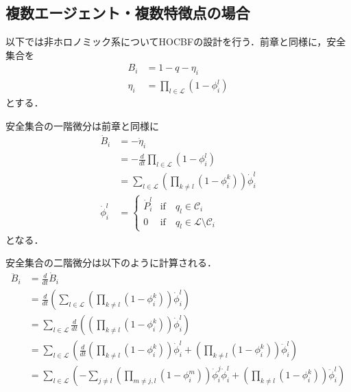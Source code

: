 \subsection{複数エージェント・複数特徴点の場合}

以下では非ホロノミック系についてHOCBFの設計を行う．前章と同様に，安全集合を
\begin{equation}
\begin{aligned}
B_{i} &= 1 - q - \eta_{i} \\
\eta_{i} &= \prod_{l \in \mathcal{L}} (1 - \phi_{i}^l)
\label{eq:safe_set_multi_hocbf}
\end{aligned}
\end{equation}
とする．

安全集合の一階微分は前章と同様に
\begin{equation}
\begin{aligned}
\dot{B}_{i} &= -\dot{\eta}_{i} \\
&= -\frac{d}{dt} \prod_{l \in \mathcal{L}} (1 - \phi_{i}^l) \\
&= \sum_{l \in \mathcal{L}} \left( \prod_{k \neq l} (1 - \phi_{i}^k) \right) \dot{\phi}^l_{i} \\
\dot{\phi}^l_{i} &= \left\{ \begin{array}{ll}
\dot{P}_i^l & \mathrm{if} \quad q_l \in \mathcal{C}_i \\
0 & \mathrm{if} \quad q_l \in \mathcal{L} \setminus \mathcal{C}_i
\end{array} \right.
\label{eq:safe_set_derivative_multi_hocbf}
\end{aligned}
\end{equation}
となる．

安全集合の二階微分は以下のように計算される．
\begin{equation}
\begin{aligned}
\ddot{B}_i &= \frac{d}{dt} \dot{B}_i \\
&= \frac{d}{dt} \left( \sum_{l \in \mathcal{L}} \left( \prod_{k \neq l} (1 - \phi_{i}^k) \right) \dot{\phi}^l_{i} \right) \\
&= \sum_{l \in \mathcal{L}} \frac{d}{dt} \left( \left( \prod_{k \neq l} (1 - \phi_{i}^k) \right) \dot{\phi}^l_{i} \right) \\
&= \sum_{l \in \mathcal{L}} \left( \frac{d}{dt} \left( \prod_{k \neq l} (1 - \phi_{i}^k) \right) \dot{\phi}^l_{i} + \left( \prod_{k \neq l} (1 - \phi_{i}^k) \right) \ddot{\phi}^l_{i} \right) \\
&= \sum_{l \in \mathcal{L}} \left( -\sum_{j \neq l} \left( \prod_{m \neq j, l} (1 - \phi_{i}^m) \right) \dot{\phi}_i^j \dot{\phi}^l_{i} + \left( \prod_{k \neq l} (1 - \phi_{i}^k) \right) \ddot{\phi}^l_{i} \right)
\label{eq:safe_set_second_derivative_multi_hocbf}
\end{aligned}
\end{equation}

